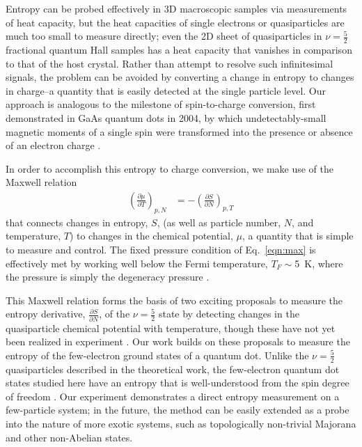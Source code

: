 \documentclass[twocolumn,showpacs,preprintnumbers,amsmath,amssymb,pra,aps,superscriptaddress]{revtex4-1}
\begin{document}
Entropy can be probed effectively in 3D macroscopic samples via measurements of heat capacity, but the heat capacities of single electrons or quasiparticles are much too small to measure directly; even the 2D sheet of quasiparticles in $\nu = \frac{5}{2}$ fractional quantum Hall samples has a heat capacity that vanishes in comparison to that of the host crystal.  Rather than attempt to resolve such infinitesimal signals, the problem can be avoided by converting a change in entropy to changes in charge--a quantity that is easily detected at the single particle level.  Our approach is analogous to the milestone of spin-to-charge conversion, first demonstrated in GaAs quantum dots in 2004, by which undetectably-small magnetic moments of a single spin were transformed into the presence or absence of an electron charge \cite{Elzerman2004, Ono2004}.

In order to accomplish this entropy to charge conversion, we make use of the Maxwell relation
%
\begin{align}
\label{eqn:max}
        \left(\frac{\partial \mu}{\partial T}\right)_{p,N} &= -\left(\frac{\partial S}{\partial N}\right)_{p,T}
\end{align}
%
that connects changes in entropy, $S$, (as well as particle number, $N$, and temperature, $T$) to changes in the chemical potential, $\mu$, a quantity that is simple to measure and control. The fixed pressure condition of Eq.~\ref{eqn:max} is effectively met by working well below the Fermi temperature, $T_F \sim$\SI{5}{\kelvin}, where the pressure is simply the degeneracy pressure \cite{Landau1969}.

This Maxwell relation forms the basis of two exciting proposals to measure the entropy derivative, $\frac{\partial S}{\partial N}$, of the $\nu = \frac{5}{2}$ state by detecting changes in the quasiparticle chemical potential with temperature, though these have not yet been realized in experiment \cite{Cooper2009,Ben-Shach2013}.  Our work builds on these proposals to measure the entropy of the few-electron ground states of a quantum dot. Unlike the $\nu = \frac{5}{2}$ quasiparticles described in the theoretical work, the few-electron quantum dot states studied here have an entropy that is well-understood from the spin degree of freedom \cite{Tarucha1996, Ciorga2000, Duncan2000, Lindemann2002, Potok2003, Hofmann2016}. Our experiment demonstrates a direct entropy measurement on a few-particle system; in the future, the method can be easily extended as a probe into the nature of more exotic systems, such as topologically non-trivial Majorana and other non-Abelian states.
\end{document}
